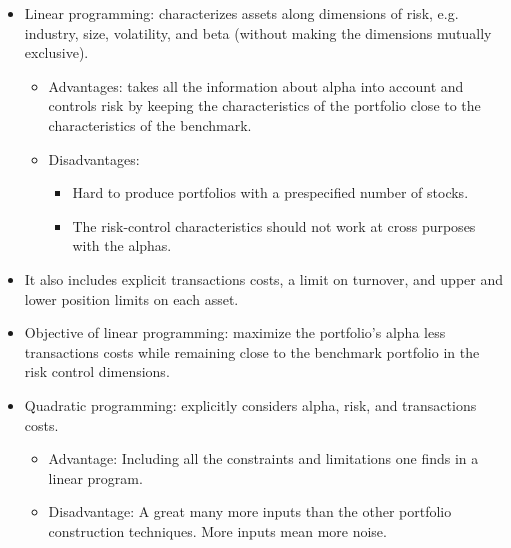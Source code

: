 \begin{itemize}
\begin{itemize}
    \end{itemize}
\item Linear programming: characterizes assets along dimensions of risk, e.g. industry, size, volatility, and beta (without making the dimensions mutually exclusive).
    \begin{itemize}
    \item Advantages: takes all the information about alpha into account and controls risk by keeping the characteristics of the portfolio close to the characteristics of the benchmark.
    \item Disadvantages:
        \begin{itemize}
        \item Hard to produce portfolios with a prespecified number of stocks.
        \item The risk-control characteristics should not work at cross purposes with the alphas.
        \end{itemize}
    \end{itemize}
\item It also includes explicit transactions costs, a limit on turnover, and upper and lower position limits on each asset.

\item Objective of linear programming: maximize the portfolio's alpha less transactions costs while remaining close to the benchmark portfolio in the risk control dimensions.

\item Quadratic programming: explicitly considers alpha, risk, and transactions costs.
    \begin{itemize}
    \item Advantage: Including all the constraints and limitations one finds in a linear program.
    \item Disadvantage: A great many more inputs than the other portfolio construction techniques. More inputs mean more noise.
    \end{itemize}
\end{itemize}




























